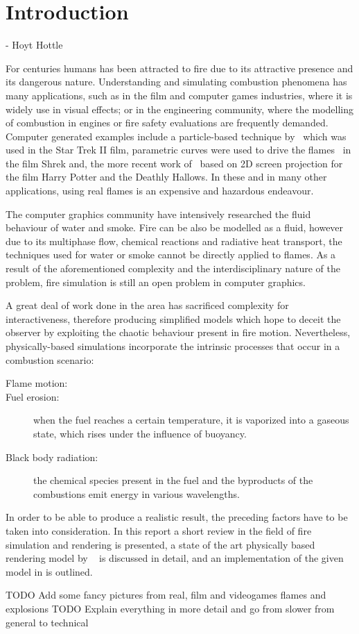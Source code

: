 \chapter{Introduction}
\label{ch:introduction}
 - Hoyt Hottle

For centuries humans has been attracted to fire due to its attractive presence and its dangerous nature.
Understanding and simulating combustion phenomena has many applications, such as in the film and computer games industries, where it is widely use in visual effects; or in the engineering community, where the modelling of combustion in engines or fire safety evaluations are frequently demanded.
Computer generated examples include a particle-based technique by~\cite{Reeves:1983} which was used in the Star Trek II film, parametric curves were used to drive the flames~\cite{Lamorlette:2002} in the film Shrek and, the more recent work of~\cite{Horvath:2009} based on 2D screen projection for the film Harry Potter and the Deathly Hallows.
In these and in many other applications, using real flames is an expensive and hazardous endeavour.

The computer graphics community have intensively researched the fluid behaviour of water and smoke.
Fire can be also be modelled as a fluid, however due to its multiphase flow, chemical reactions and radiative heat transport, the techniques used for water or smoke cannot be directly applied to flames.
As a result of the aforementioned complexity and the interdisciplinary nature of the problem, fire simulation is still an open problem in computer graphics.

A great deal of work done in the area has sacrificed complexity for interactiveness, therefore producing simplified models which hope to deceit the observer by exploiting the chaotic behaviour present in fire motion.
Nevertheless, physically-based simulations incorporate the intrinsic processes that occur in a combustion scenario:

\begin{description}
\item[Flame motion:]
\item[Fuel erosion:] when the fuel reaches a certain temperature, it is vaporized into a gaseous state, which rises under the influence of buoyancy.
\item[Black body radiation:] the chemical species present in the fuel and the byproducts of the combustions emit energy in various wavelengths.
\end{description}

In order to be able to produce a realistic result, the preceding factors have to be taken into consideration.
In this report a short review in the field of fire simulation and rendering is presented, a state of the art physically based rendering model by ~\cite{Pegoraro:2006} is discussed in detail, and an implementation of the given model in \Maya is outlined.

TODO Add some fancy pictures from real, film and videogames flames and explosions
TODO Explain everything in more detail and go from slower from general to technical